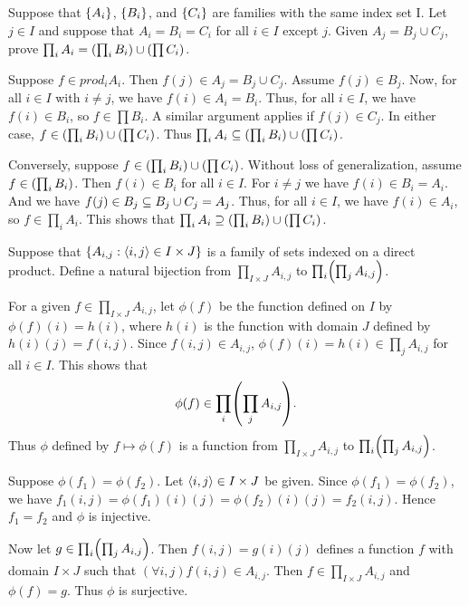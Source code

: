 \begin{exercise}
Suppose that $\left\{A_i\right\}$, $\left\{B_i\right\}$, and $\left\{C_i\right\}$ are families with the same index set I.
Let $j\in I$ and suppose that $A_i=B_i=C_i$ for all $i\in I$ except $j$. Given
$A_j=B_j\cup C_j$, prove $\prod_i A_i = \left(\prod_i B_i\right) \cup \left(\prod C_i\right)$.
\end{exercise}

\begin{solution}
Suppose $f\in prod_i A_i$. Then $f(j)\in A_j=B_j\cup C_j$. Assume $f(j)\in B_j$.
Now, for all $i\in I$ with $i\neq j$, we have $f(i)\in A_i=B_i$.
Thus, for all $i\in I$, we have $f(i)\in B_i$, so $f\in\prod B_i$.
A similar argument applies if $f(j)\in C_j$.
In either case, $f\in \left(\prod_i B_i\right) \cup \left(\prod C_i\right)$.
Thus $\prod_i A_i \subseteq \left(\prod_i B_i\right) \cup \left(\prod C_i\right)$.

Conversely, suppose $f\in \left(\prod_i B_i\right) \cup \left(\prod C_i\right)$.
Without loss of generalization, assume $f\in \left(\prod_i B_i\right)$.
Then $f(i)\in B_i$ for all $i\in I$.
For $i\neq j$ we have $f(i)\in B_i=A_i$.
And we have $f(j)\in B_j\subseteq B_j\cup C_j = A_j$.
Thus, for all $i\in I$, we have $f(i)\in A_i$, so $f\in \prod_i A_i$.
This shows that $\prod_i A_i \supseteq \left(\prod_i B_i\right) \cup \left(\prod C_i\right)$.
\end{solution}

\begin{exercise}
Suppose that $\left\{ A_{i,j} : \left\langle i,j\right\rangle\in I\times J \right\}$ is a family of sets indexed on
a direct product. Define a natural bijection from $\prod_{I\times J} A_{i,j}$
to $\prod_i\prn{\prod_j A_{i,j}}$.
\end{exercise}

\begin{solution}
For a given $f\in \prod_{I\times J} A_{i,j}$, let $\phi(f)$ be the function defined on $I$
by $\phi(f)(i)=h(i)$, where $h(i)$ is the function with domain $J$ defined
by $h(i)(j)=f(i,j)$.
Since $f(i,j)\in A_{i,j}$, $\phi(f)(i)=h(i)\in \prod_j A_{i,j}$ for all $i\in I$.
This shows that
\[\phi(f)\in\prod_i\prn{\prod_j A_{i,j}}.\]
Thus $\phi$ defined by $f\mapsto \phi(f)$ is a function from $\prod_{I\times J} A_{i,j}$
to $\prod_i\prn{\prod_j A_{i,j}}$.

Suppose $\phi(f_1)=\phi(f_2)$.
Let $\left\langle i,j\right\rangle\in I\times J$ be given.
Since $\phi(f_1)=\phi(f_2)$, we have $f_1(i,j)=\phi(f_1)(i)(j)=\phi(f_2)(i)(j)=f_2(i,j)$.
Hence $f_1=f_2$ and $\phi$ is injective.

Now let $g\in \prod_i\prn{\prod_j A_{i,j}}$.
Then $f(i,j)=g(i)(j)$ defines a function $f$ with domain $I\times J$ such that $(\forall i,j)f(i,j)\in A_{i,j}$.
Then $f\in \prod_{I\times J} A_{i,j}$ and $\phi(f)=g$.
Thus $\phi$ is surjective.
\end{solution}

